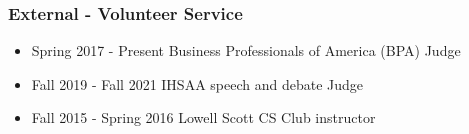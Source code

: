 \documentclass{shanep}
\begin{document}
\subsubsection*{External - Volunteer Service}
\begin{itemize}
  \item Spring 2017 - Present Business Professionals of America (BPA) Judge
  \item Fall 2019 - Fall 2021 IHSAA speech and debate Judge
  \item Fall 2015 - Spring 2016 Lowell Scott CS Club instructor
\end{itemize}
\end{document}
